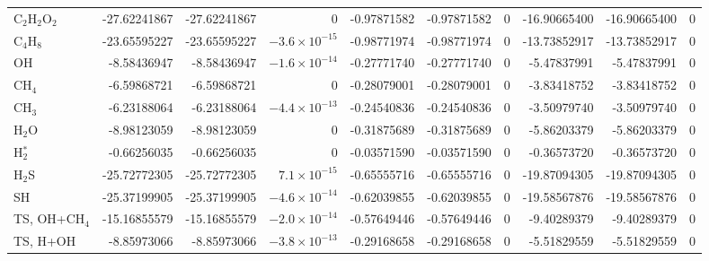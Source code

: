 \begin{tabular}{@{}l rrr rrr rrr@{}}
C$_2$H$_2$O$_2$ & -27.62241867 & -27.62241867 & \textcolor{green!50!black}{0} & -0.97871582 & -0.97871582 & \textcolor{green!50!black}{0} & -16.90665400 & -16.90665400 & \textcolor{green!50!black}{0} \\
C$_4$H$_8$ & -23.65595227 & -23.65595227 & \textcolor{green!50!black}{$-3.6\times10^{-15}$} & -0.98771974 & -0.98771974 & \textcolor{green!50!black}{0} & -13.73852917 & -13.73852917 & \textcolor{green!50!black}{0} \\
OH & -8.58436947 & -8.58436947 & \textcolor{green!50!black}{$-1.6\times10^{-14}$} & -0.27771740 & -0.27771740 & \textcolor{green!50!black}{0} & -5.47837991 & -5.47837991 & \textcolor{green!50!black}{0} \\
CH$_4$ & -6.59868721 & -6.59868721 & \textcolor{green!50!black}{0} & -0.28079001 & -0.28079001 & \textcolor{green!50!black}{0} & -3.83418752 & -3.83418752 & \textcolor{green!50!black}{0} \\
CH$_3$ & -6.23188064 & -6.23188064 & \textcolor{green!50!black}{$-4.4\times10^{-13}$} & -0.24540836 & -0.24540836 & \textcolor{green!50!black}{0} & -3.50979740 & -3.50979740 & \textcolor{green!50!black}{0} \\
H$_2$O & -8.98123059 & -8.98123059 & \textcolor{green!50!black}{0} & -0.31875689 & -0.31875689 & \textcolor{green!50!black}{0} & -5.86203379 & -5.86203379 & \textcolor{green!50!black}{0} \\
H$_2^{*}$ & -0.66256035 & -0.66256035 & \textcolor{green!50!black}{0} & -0.03571590 & -0.03571590 & \textcolor{green!50!black}{0} & -0.36573720 & -0.36573720 & \textcolor{green!50!black}{0} \\
H$_2$S & -25.72772305 & -25.72772305 & \textcolor{green!50!black}{$7.1\times10^{-15}$} & -0.65555716 & -0.65555716 & \textcolor{green!50!black}{0} & -19.87094305 & -19.87094305 & \textcolor{green!50!black}{0} \\
SH & -25.37199905 & -25.37199905 & \textcolor{green!50!black}{$-4.6\times10^{-14}$} & -0.62039855 & -0.62039855 & \textcolor{green!50!black}{0} & -19.58567876 & -19.58567876 & \textcolor{green!50!black}{0} \\
TS, OH+CH$_4$ & -15.16855579 & -15.16855579 & \textcolor{green!50!black}{$-2.0\times10^{-14}$} & -0.57649446 & -0.57649446 & \textcolor{green!50!black}{0} & -9.40289379 & -9.40289379 & \textcolor{green!50!black}{0} \\
TS, H+OH & -8.85973066 & -8.85973066 & \textcolor{green!50!black}{$-3.8\times10^{-13}$} & -0.29168658 & -0.29168658 & \textcolor{green!50!black}{0} & -5.51829559 & -5.51829559 & \textcolor{green!50!black}{0} \\

\end{tabular}
